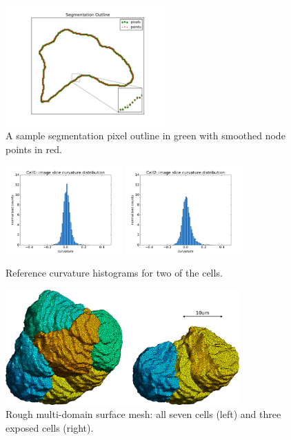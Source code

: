 \documentclass[a4paper,10pt]{article}
\begin{document}
\begin{figure}[H]
\begin{center}
\includegraphics[width=0.55\textwidth]{images/outline.pdf}
\end{center}
\vspace{-5mm}
\caption{A sample segmentation pixel outline in green with smoothed node points in red.}
\label{fig:slice_outline}
\end{figure}

\begin{figure}[H]
\begin{center}
\includegraphics[width=0.4\textwidth]{images/cell1_curv.pdf}
\includegraphics[width=0.4\textwidth]{images/cell2_curv.pdf}
\end{center}
\caption{Reference curvature histograms for two of the cells.}
\label{fig:ref_histogram}
\end{figure}

\begin{figure}[H]
\begin{center}
\includegraphics[width=0.8\textwidth]{images/rough.pdf}
\end{center}
\caption{Rough multi-domain surface mesh: all seven cells (left) and three exposed cells (right).}
\label{fig:rough}
\end{figure}
\end{document}
